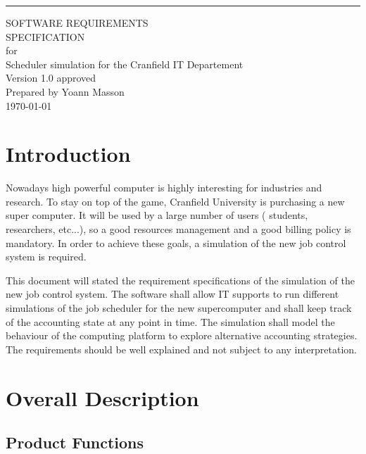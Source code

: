 \documentclass{scrreprt}
\date{}
\def\myversion{1.0 }
\begin{document}
\begin{flushright}
    \rule{16cm}{5pt}\vskip1cm
    \begin{bfseries}
        \Huge{SOFTWARE REQUIREMENTS\\ SPECIFICATION}\\
        \vspace{1.9cm}
        for\\
        \vspace{1.9cm}
        Scheduler simulation for the Cranfield IT Departement\\
        \vspace{1.9cm}
        \LARGE{Version \myversion approved}\\
        \vspace{1.9cm}
        Prepared by Yoann Masson\\
        \today\\
    \end{bfseries}
\end{flushright}

\tableofcontents

\chapter{Introduction}

Nowadays high powerful computer is highly interesting for industries and research. To stay on top of the game, Cranfield University is purchasing a new super computer. It will be used by a large number of users ( students, researchers, etc...), so a good resources management and a good billing policy is mandatory. In order to achieve these goals, a simulation of the new job control system is required. 

This document will stated the requirement specifications of the simulation of the new job control system. The software shall allow IT supports to run different simulations of the job scheduler for the new supercomputer and shall keep track of the accounting state at any point in time. The simulation shall model the behaviour of the computing platform to explore alternative accounting strategies.
The requirements should be well explained and not subject to any interpretation.



\chapter{Overall Description}

\section{Product Functions}
\end{document}
